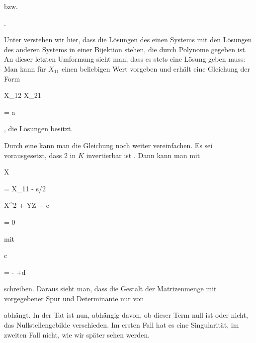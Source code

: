 { {  }


bzw.


 { . }


Unter  verstehen wir hier, dass die Lösungen des einen Systems mit den Lösungen des anderen Systems in einer Bijektion stehen, die durch Polynome gegeben ist. An dieser letzten Umformung sieht man, dass es stets eine Lösung geben muss: Man kann für $X_{11}$ einen beliebigen Wert vorgeben und erhält eine Gleichung der Form


\mavergleichskette


{\vergleichskette


{ X_{12} X_{21}
}


{ = }{ a
}


{  }{
}


{    }{
}


{   }{
}


}
{}{}{,}
die Lösungen besitzt.


Durch eine  {} kann man die Gleichung noch weiter vereinfachen. Es sei vorausgesetzt, dass $2$ in $K$ invertierbar ist
 {} {.}
Dann kann man mit


\mavergleichskette


{\vergleichskette


{ X
}


{ = }{ X_{11} - s/2
}


{  }{
}


{    }{
}


{   }{
}


}
{}{}{}
 {} {}


\mavergleichskettedisp


{\vergleichskette


{ X^2 + YZ + c
}


{ =} { 0
}


{ } {
}


{ } {
}


{ } {
}


}
{}{}{}
mit


\mavergleichskette


{\vergleichskette


{ c
}


{ = }{ - {  } +d
}


{  }{
}


{    }{
}


{   }{
}


}
{}{}{}
schreiben. Daraus sieht man, dass die Gestalt der Matrizenmenge mit vorgegebener Spur und Determinante nur von


 abhängt. In der Tat ist nun, abhängig davon, ob dieser Term null ist oder nicht, das Nullstellengebilde verschieden. Im ersten Fall hat es eine Singularität, im zweiten Fall nicht, wie wir später sehen werden.


}


